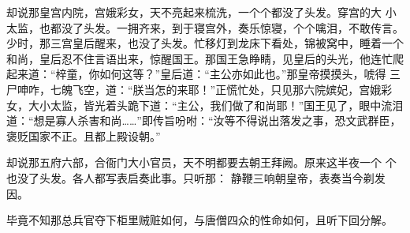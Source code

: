 却说那皇宫内院，宫娥彩女，天不亮起来梳洗，一个个都没了头发。穿宫的大
小太监，也都没了头发。一拥齐来，到于寝宫外，奏乐惊寝，个个噙泪，不敢传言。
少时，那三宫皇后醒来，也没了头发。忙移灯到龙床下看处，锦被窝中，睡着一个
和尚，皇后忍不住言语出来，惊醒国王。那国王急睁睛，见皇后的头光，他连忙爬
起来道：“梓童，你如何这等？”皇后道：“主公亦如此也。”那皇帝摸摸头，唬得
三尸呻咋，七魄飞空，道：“朕当怎的来耶！”正慌忙处，只见那六院嫔妃，宫娥彩
女，大小太监，皆光着头跪下道：“主公，我们做了和尚耶！”国王见了，眼中流泪
道：“想是寡人杀害和尚……”即传旨吩咐：“汝等不得说出落发之事，恐文武群臣，
褒贬国家不正。且都上殿设朝。”

却说那五府六部，合衙门大小官员，天不明都要去朝王拜阙。原来这半夜一个
个也没了头发。各人都写表启奏此事。只听那：
静鞭三响朝皇帝，表奏当今剃发因。

毕竟不知那总兵官夺下柜里贼赃如何，与唐僧四众的性命如何，且听下回分解。